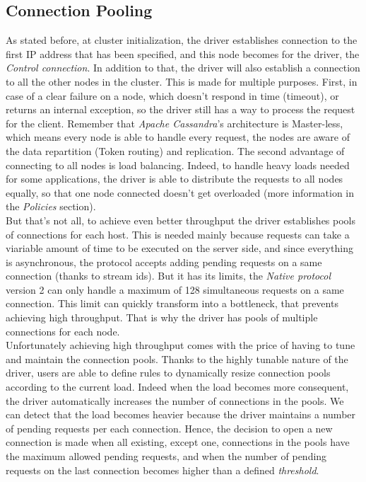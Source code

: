 \documentclass[a4paper]{report}
\newcommand{\ca}{\emph{Apache Cassandra\xspace}}
\begin{document}
\subsection{Connection Pooling}
As stated before, at cluster initialization, the driver establishes connection to the first IP address that has been specified, and this node becomes for the driver, the \emph{Control connection}. In addition to that, the driver will also establish a connection to all the other nodes in the cluster. This is made for multiple purposes. First, in case of a clear failure on a node, which doesn't respond in time (timeout), or returns an internal exception, so the driver still has a way to process the request for the client. Remember that \ca{}'s architecture is Master-less, which means every node is able to handle every request, the nodes are aware of the data repartition (Token routing) and replication. The second advantage of connecting to all nodes is load balancing. Indeed, to handle heavy loads needed for some applications, the driver is able to distribute the requests to all nodes equally, so that one node connected doesn't get overloaded (more information in the \emph{Policies} section).\\
But that's not all, to achieve even better throughput the driver establishes pools of connections for each host. This is needed mainly because requests can take a viariable amount of time to be executed on the server side, and since everything is asynchronous, the protocol accepts adding pending requests on a same connection (thanks to stream ids). But it has its limits, the \emph{Native protocol} version 2 can only handle a maximum of 128 simultaneous requests on a same connection. This limit can quickly transform into a bottleneck, that prevents achieving high throughput. That is why the driver has pools of multiple connections for each node.\\
Unfortunately achieving high throughput comes with the price of having to tune and maintain the connection pools. Thanks to the highly tunable nature of the driver, users are able to define rules to dynamically resize connection pools according to the current load. Indeed when the load becomes more consequent, the driver automatically increases the number of connections in the pools. We can detect that the load becomes heavier because the driver maintains a number of pending requests per each connection. Hence, the decision to open a new connection is made when all existing, except one, connections in the pools have the maximum allowed pending requests, and when the number of pending requests on the last connection becomes higher than a defined \emph{threshold}.\\
\end{document}
